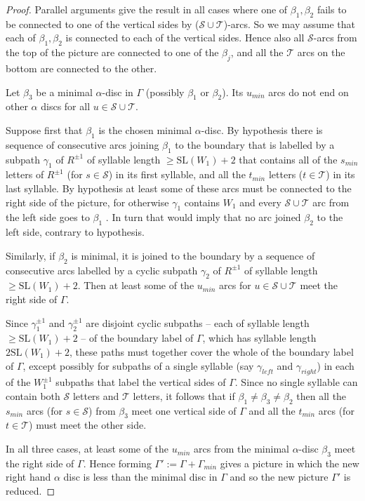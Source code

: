 \documentclass[12pt,a4paper]{amsart}
\def\G{\Gamma}
\def\a{\alpha}
\def\b{\beta}
\def\g{\gamma}
\def\cS{\mathcal{S}}
\def\cT{\mathcal{T}}
\begin{document}
\begin{proof}
	Parallel arguments give the result in all cases where one of $\b_1,\b_2$ fails to be connected to one of the vertical sides by ($\cS\cup\cT$)-arcs.  So we may assume that each of $\b_1,\b_2$ is connected to each of the vertical sides.
	Hence also all $\cS$-arcs from the top of the picture are connected to one of the $\b_j$, and all the $\cT$ arcs on the bottom are connected to the other.
	
	
	Let $\b_3$ be a 
minimal $\a$-disc in $\Gamma$ (possibly $\b_1$ or $\b_2$). 
	Its $u_{min}$ arcs do not end on other $\a$ discs for all $u\in \cS\cup\cT$.
	
 Suppose first that $\b_1$ is the chosen minimal $\a$-disc.  
		By hypothesis there is sequence of consecutive arcs joining $\b_1$ to the boundary that is labelled by a subpath $\g_1$ of $R^{\pm 1}$ of syllable length $\ge\text{SL}(W_1)+2$ that contains all of the $s_{min}$ letters of $R^{\pm1}$ (for $s\in\cS$) in its first syllable, and all the $t_{min}$ letters ($t\in\cT$) in its last syllable.   By hypothesis at least some of these arcs must be connected to the right side of the picture, for otherwise $\g_1$ contains $W_1$ and every $\cS\cup\cT$ arc from the left side goes to $\b_1$ . In turn that would imply that no arc joined $\b_2$ to the left side, contrary to hypothesis.   
		
		Similarly, if $\b_2$ is minimal, it is joined to the boundary by a sequence of consecutive arcs labelled by a cyclic subpath $\g_2$ of $R^{\pm1}$ of syllable length $\ge\text{SL}(W_1)+2$.  Then at least some of the $u_{min}$ arcs for $u\in\cS\cup\cT$ meet the right side of $\G$. 
		
		Since $\g_1^{\pm1}$ and $\g_2^{\pm1}$ are disjoint cyclic subpaths -- each of syllable length $\ge \text{SL}(W_1)+2$ -- of the boundary label of $\G$, which has syllable length $2\text{SL}(W_1)+2$, these paths must together  cover the whole of the boundary label of $\G$, except possibly for subpaths of a single syllable (say $\g_{left}$ and $\g_{right}$) in each of the $W_1^{\pm1}$ subpaths that label the vertical sides of $\G$.   Since no single syllable can contain both $\cS$ letters and $\cT$ letters, it follows that if $\b_1\ne\b_3\ne\b_2$ then all the $s_{min}$ arcs (for $s\in\cS$) from $\b_3$ meet one vertical side of $\G$ and all the $t_{min}$ arcs (for $t\in\cT$) must meet the other side.
		
		 
		In all three cases, at least some of the  $u_{min}$  arcs from the minimal $\a$-disc $\b_3$ meet the right side of $\G$. Hence  forming $\Gamma':= \Gamma +\G_{min}$ gives a picture in which the new right hand $\a$ disc
		is less than the 
minimal disc in $\Gamma$ and so the new picture $\G'$ is reduced. 
		

\end{proof}
\end{document}
